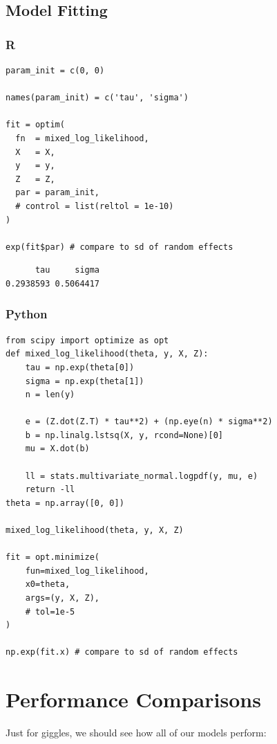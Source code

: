 \documentclass[
  letterpaper,
]{krantz}
\begin{document}
\subsection{Model Fitting}\label{model-fitting}

\subsubsection{R}

\begin{verbatim}
param_init = c(0, 0)

names(param_init) = c('tau', 'sigma')

fit = optim(
  fn  = mixed_log_likelihood,
  X   = X,
  y   = y,
  Z   = Z,
  par = param_init,
  # control = list(reltol = 1e-10)
)

exp(fit$par) # compare to sd of random effects
\end{verbatim}

\begin{verbatim}
      tau     sigma 
0.2938593 0.5064417 
\end{verbatim}

\subsubsection{Python}

\begin{verbatim}
from scipy import optimize as opt
def mixed_log_likelihood(theta, y, X, Z):
    tau = np.exp(theta[0])
    sigma = np.exp(theta[1])
    n = len(y)
    
    e = (Z.dot(Z.T) * tau**2) + (np.eye(n) * sigma**2)
    b = np.linalg.lstsq(X, y, rcond=None)[0]
    mu = X.dot(b) 
    
    ll = stats.multivariate_normal.logpdf(y, mu, e)
    return -ll
theta = np.array([0, 0])

mixed_log_likelihood(theta, y, X, Z)

fit = opt.minimize(
    fun=mixed_log_likelihood,
    x0=theta,
    args=(y, X, Z),
    # tol=1e-5
)

np.exp(fit.x) # compare to sd of random effects
\end{verbatim}

\section{Performance Comparisons}\label{performance-comparisons}

Just for giggles, we should see how all of our models perform:
\end{document}
